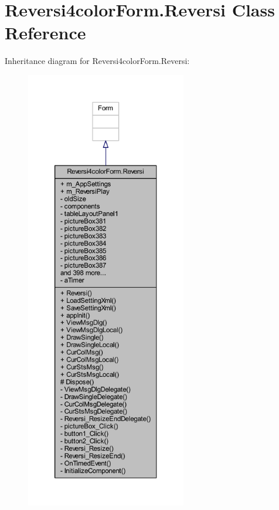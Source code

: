 \hypertarget{class_reversi4color_form_1_1_reversi}{}\section{Reversi4color\+Form.\+Reversi Class Reference}
\label{class_reversi4color_form_1_1_reversi}


Inheritance diagram for Reversi4color\+Form.\+Reversi\+:
\nopagebreak
\begin{figure}[H]
\begin{center}
\leavevmode
\includegraphics[height=550pt]{class_reversi4color_form_1_1_reversi__inherit__graph}
\end{center}
\end{figure}


